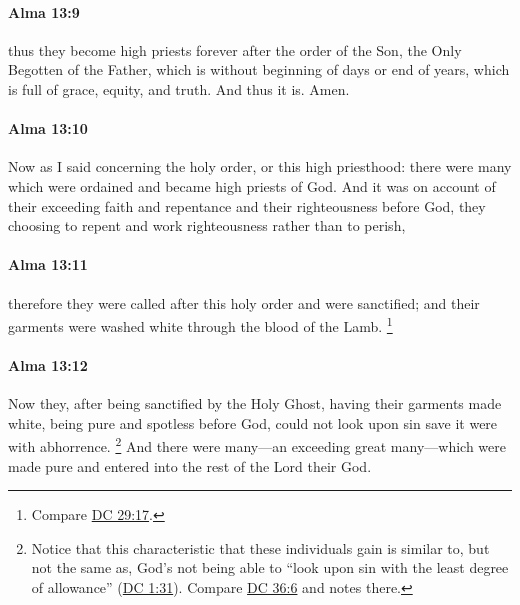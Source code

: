 		\paragraph{Alma 13:9} %
			\label{ALMA-13-9}

			thus they become high priests forever
			after the order of the Son, the Only Begotten of the Father,
			which is without beginning of days or end of years,
			which is full of grace, equity, and truth.
			And thus it is.
			Amen.

		\paragraph{Alma 13:10} %
			\label{ALMA-13-10}

			Now as I said concerning the holy order, or this high priesthood:
			there were many which were ordained and became high priests of God.
			And it was on account of their exceeding faith and repentance
			and their righteousness before God,
			they choosing to repent and work righteousness rather than to perish,

		\paragraph{Alma 13:11} %
			\label{ALMA-13-11}

			therefore they were called after this holy order and were sanctified;
			and their garments were washed white through the blood of the Lamb.%
				\footnote{%
					Compare \hyperref[DC29-17]{DC 29:17}.
					}

		\paragraph{Alma 13:12} %
			\label{ALMA-13-12}

			Now they, after being sanctified by the Holy Ghost,
			having their garments made white,
			being pure and spotless before God,
			could not look upon sin save it were with abhorrence.%
				\footnote{%
					Notice that this characteristic that these individuals gain is similar to, but not the same as, God's not being able to ``look upon sin with the least degree of allowance'' (\hyperref[DC1-31]{DC 1:31}). Compare \hyperref[DC36-6]{DC 36:6} and notes there.
					}
			And there were many---an exceeding great many---which were made pure
			and entered into the rest of the Lord their God.

